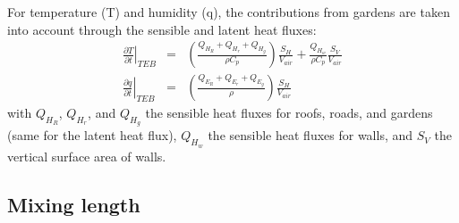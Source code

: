 For temperature (T) and humidity (q), the contributions from gardens are taken into account 
through the sensible and latent heat fluxes:
{\footnotesize
\begin{eqnarray}
\left. \frac{\partial T}{\partial t} \right|_{TEB} & = & \left ( \frac{Q_{H_R}+Q_{H_r}+Q_{H_g}}{\rho C_p} \right ) \frac{S_H}{V_{air}} 
                                                               + \frac{Q_{H_w}}{\rho C_p} \frac{S_V}{V_{air}} \\
\left. \frac{\partial q}{\partial t} \right|_{TEB} & = & \left ( \frac{Q_{E_R}+Q_{E_r}+Q_{E_g}}{\rho} \right ) \frac{S_H}{V_{air}}
\end{eqnarray}
}
with $Q_{H_R}$, $Q_{H_r}$, and $Q_{H_g}$ the sensible heat fluxes for roofs, roads, and 
gardens (same for the latent heat flux), $Q_{H_w}$ the sensible heat fluxes for walls, 
and $S_V$ the vertical surface area of walls. \\


\subsection{Mixing length}

